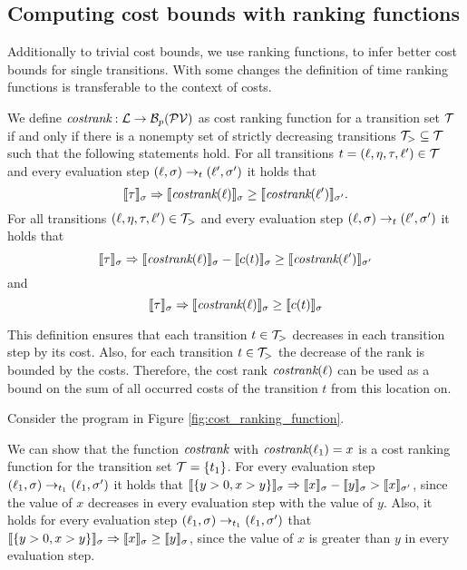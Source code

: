 \subsection{Computing cost bounds with ranking functions}

Additionally to trivial cost bounds, we use ranking functions, to infer better cost bounds for single transitions.
With some changes the definition of time ranking functions is transferable to the context of costs.

\begin{definition} 
  We define $\emph{costrank}: \mathcal{L} \rightarrow \mathcal{B}_p(\mathcal{PV})$ as cost ranking function for a transition set $\mathcal{T}$ if and only if there is a nonempty set of strictly decreasing transitions $\mathcal{T}_{>} \subseteq \mathcal{T}$ such that the following statements hold.
  For all transitions $t = (\ell, \eta, \tau, \ell') \in \mathcal{T}$ and every evaluation step $(\ell, \sigma) \rightarrow_t (\ell', \sigma')$ it holds that
  \[ \llbracket \tau \rrbracket_{\sigma} \Rightarrow \llbracket \emph{costrank}(\ell) \rrbracket_{\sigma} \geq \llbracket \emph{costrank}(\ell') \rrbracket_{\sigma'}. \]
  For all transitions $(\ell, \eta, \tau, \ell') \in \mathcal{T}_{>}$ and every evaluation step $(\ell, \sigma) \rightarrow_t (\ell', \sigma')$ it holds that        
  \[ \llbracket \tau \rrbracket_{\sigma} \Rightarrow \llbracket \emph{costrank}(\ell) \rrbracket_{\sigma} - \llbracket c(t) \rrbracket_{\sigma} \geq \llbracket \emph{costrank}(\ell') \rrbracket_{\sigma'} \]
  and
  \[ \llbracket \tau \rrbracket_{\sigma} \Rightarrow \llbracket \emph{costrank}(\ell) \rrbracket_{\sigma} \geq \llbracket c(t) \rrbracket_{\sigma} \]
\end{definition}

This definition ensures that each transition $t \in \mathcal{T}_>$ decreases in each transition step by its cost.
Also, for each transition $t \in \mathcal{T}_>$ the decrease of the rank  is bounded by the costs.
Therefore, the cost rank $\emph{costrank}(\ell)$ can be used as a bound on the sum of all occurred costs of the transition $t$ from this location on.

\begin{example}
  Consider the program in Figure \ref{fig:cost_ranking_function}.
  
  We can show that the function $\emph{costrank}$ with $\emph{costrank}(\ell_1) = x$ is a cost ranking function for the transition set $\mathcal{T} = \lbrace t_1 \rbrace$.
  For every evaluation step $(\ell_1,\sigma) \rightarrow_{t_1} (\ell_1,\sigma')$ it holds that $\llbracket \lbrace y > 0, x > y \rbrace \rrbracket_{\sigma} \Rightarrow \llbracket x \rrbracket_{\sigma} - \llbracket y \rrbracket_{\sigma} > \llbracket x \rrbracket_{\sigma'}$, since the value of $x$ decreases in every evaluation step with the value of $y$.
  Also, it holds for every evaluation step $(\ell_1,\sigma) \rightarrow_{t_1} (\ell_1,\sigma')$ that $\llbracket \lbrace y > 0, x > y \rbrace \rrbracket_{\sigma} \Rightarrow \llbracket x \rrbracket_{\sigma} \geq \llbracket y \rrbracket_{\sigma}$, since the value of $x$ is greater than $y$ in every evaluation step.
\end{example}

